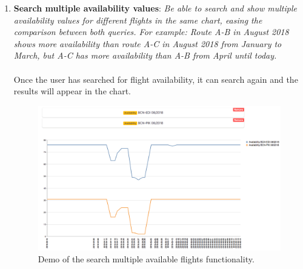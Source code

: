 \begin{enumerate}
    \item \textbf{Search multiple availability values}: \textit{Be able to search and show multiple availability values for different flights in the same chart, easing the comparison between both queries. For example: Route A-B in August 2018 shows more availability than route A-C in August 2018 from January to March, but A-C has more availability than A-B from April until today.}
    \\\\
    Once the user has searched for flight availability, it can search again and the results will appear in the chart.
    \begin{figure}[H]
    \centering
    \includegraphics[scale=0.3]{resources/search-multiple-availability.png}
    \caption{Demo of the search multiple available flights functionality.}
    \end{figure}


\end{enumerate}
